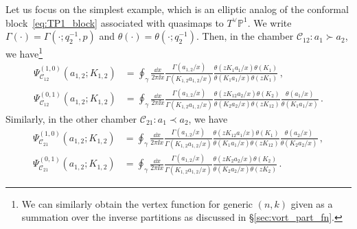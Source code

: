 Let us focus on the simplest example, which is an elliptic analog of the conformal block~\eqref{eq:TP1_block} associated with quasimaps to $T^\vee\mathbb{P}^1$.
We write $\Gamma(\cdot) = \Gamma(\cdot;q_2^{-1},p)$ and $\theta(\cdot) = \theta(\cdot;q_2^{-1})$.
Then, in the chamber $\mathscr{C}_{12}: a_1 \succ a_2$, we have\footnote{We can similarly obtain the vertex function for generic $(n,k)$ given as a summation over the inverse partitions as discussed in \S\ref{sec:vort_part_fn}.
}
\begin{subequations}\label{eq:TP1_block12_elliptic}
\begin{align}
    \Psi_{\mathscr{C}_{12}}^{(1,0)}(a_{1,2};K_{1,2}) & = \oint_\gamma \frac{\dd{x}}{2 \pi \ii x} \frac{\Gamma(a_{1,2} / x)}{\Gamma(K_{1,2} a_{1,2} / x)} \frac{\theta(z K_1 a_1/x) \theta(K_1)}{\theta(K_1 a_1/x) \theta(z K_1)}
    \, , \\ 
    \Psi_{\mathscr{C}_{12}}^{(0,1)}(a_{1,2};K_{1,2}) & = \oint_\gamma \frac{\dd{x}}{2 \pi \ii x} \frac{\Gamma(a_{1,2} / x)}{\Gamma(K_{1,2} a_{1,2} / x)} \frac{\theta(z K_{12} a_2/x) \theta(K_2)}{\theta(K_2 a_2/x) \theta(z K_{12})} \frac{\theta(a_1/x)}{\theta(K_1 a_1 / x)}
    \, .
\end{align}
\end{subequations}
Similarly, in the other chamber $\mathscr{C}_{21}: a_1 \prec a_2$, we have
\begin{subequations}\label{eq:TP1_block21_elliptic}
\begin{align}
    \Psi_{\mathscr{C}_{21}}^{(1,0)}(a_{1,2};K_{1,2}) & = \oint_\gamma \frac{\dd{x}}{2 \pi \ii x} \frac{\Gamma(a_{1,2} / x)}{\Gamma(K_{1,2} a_{1,2} / x)} \frac{\theta(z K_{12} a_1/x) \theta(K_1)}{\theta(K_1 a_1/x) \theta(z K_{12})} \frac{\theta(a_2/x)}{\theta(K_2 a_2 / x)}
    \, , \\ 
    \Psi_{\mathscr{C}_{21}}^{(0,1)}(a_{1,2};K_{1,2}) & = \oint_\gamma \frac{\dd{x}}{2 \pi \ii x} \frac{\Gamma(a_{1,2} / x)}{\Gamma(K_{1,2} a_{1,2} / x)} \frac{\theta(z K_2 a_2/x) \theta(K_2)}{\theta(K_2 a_2/x) \theta(z K_2)}
    \, .
\end{align}
\end{subequations}




